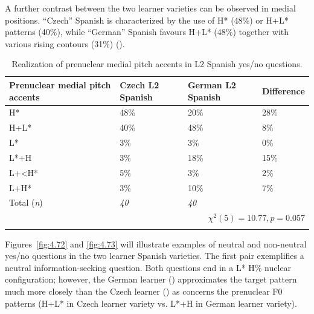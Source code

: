 A further contrast between the two learner varieties can be observed in medial positions. “Czech” Spanish is characterized by the use of H* (48\%) or H+L* patterns (40\%), while “German” Spanish favours H+L* (48\%) together with various rising contours (31\%) ().

\begin{table}
\begin{tabularx}{\textwidth}{lYYY}

\lsptoprule

{Prenuclear medial pitch accents} & {Czech L2 Spanish} & {German L2 Spanish} & {Difference}\\
\midrule
H* &  48\% &  20\% &  28\%\\
H+L* &  40\% &  48\% &  8\%\\
L* &  3\% &  3\% &  0\%\\
L*+H &  3\% &  18\% &  15\%\\
L+<H* &  5\% &  3\% &  2\%\\
L+H* &  3\% &  10\% &  7\%\\
\midrule
Total (\textit{n}) & {\itshape 40} & {\itshape 40} &  \\
\\
\lspbottomrule
\end{tabularx}

\caption{Realization of prenuclear medial pitch accents in L2 Spanish yes/no questions.}
\label{tab:4.21}
\end{table}


Figures~\ref{fig:4.72} and \ref{fig:4.73} will illustrate examples of neutral and non-neutral yes\slash no questions in the two learner Spanish varieties. The first pair exemplifies a neutral information-seeking question. Both questions end in a L* H\% nuclear configuration; however, the German learner () approximates the target pattern much more closely than the Czech learner () as concerns the prenuclear F0 patterns (H+L* in Czech learner variety vs. L*+H in German learner variety).


